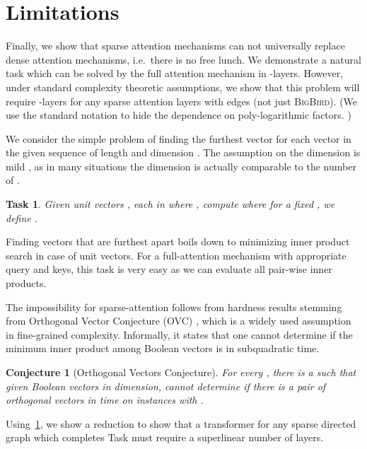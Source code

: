 \documentclass{article}
\newcommand{\bigb}{\textsc{BigBird}\xspace}
\newtheorem{task}{Task}
\newtheorem{conjecture}{Conjecture}
\begin{document}
\section{Limitations} 
\label{sec:apndx-limit}

Finally, we show that sparse attention mechanisms can not universally replace dense attention mechanisms, i.e.~there is no free lunch.
We demonstrate a natural task which can be solved by the full attention mechanism in -layers.
However, under standard complexity theoretic assumptions, we show that this problem will require 
-layers for any sparse attention layers with  edges (not just \bigb).
(We use the standard notation   to hide the dependence on poly-logarithmic factors. )

We consider the simple problem of finding the furthest vector for each vector 
in the given sequence of length  and dimension . The assumption on 
the dimension is mild , as in many situations the dimension  is actually comparable to 
the number of . 

\begin{task}
Given  unit vectors , each in  where , 
compute   where for a fixed , we define 
.
\end{task}


Finding vectors that are furthest apart boils down to minimizing inner product search 
in case of unit vectors. For a full-attention mechanism with appropriate query and keys, 
this task is very easy as we can evaluate all pair-wise inner products. 

The impossibility for sparse-attention follows from hardness results stemming from  
Orthogonal Vector Conjecture (OVC) \citep{abboud2015tight,abboud2014consequences,williams2005new,backurs2015edit}, which is a widely used assumption in fine-grained complexity. Informally, it states that 
one cannot determine if the minimum inner product among  Boolean vectors is  in 
subquadratic time.  
\begin{conjecture}[Orthogonal Vectors Conjecture] \label{conj:ovc}
For every , there is a  such that given  Boolean vectors in 
 dimension, cannot determine if there is a pair of orthogonal vectors in 
time on instances with . 
\end{conjecture}

Using~\cref{conj:ovc}, we show a reduction to show that a 
transformer  for any sparse directed graph  
which completes Task   must require a superlinear number of layers. 
\end{document}
